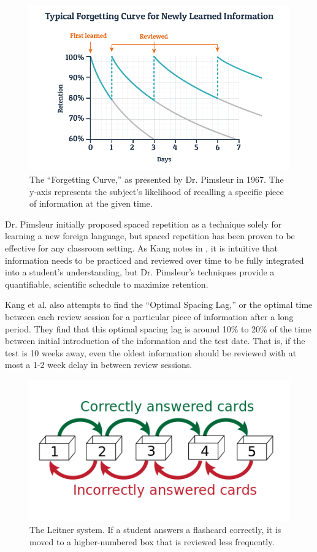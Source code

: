 \begin{figure}[h]
	\includegraphics[width=1.0\linewidth]{figures/forgetting-curve}
	\caption{The ``Forgetting Curve,'' as presented by Dr. Pimsleur in 1967. The y-axis represents the subject's likelihood of recalling a specific piece of information at the given time.}
	\label{fig:forgetting-curve}
\end{figure}

\par Dr. Pimsleur initially proposed spaced repetition as a technique solely for learning a new foreign language, but spaced repetition has been proven to be effective for any classroom setting. As Kang notes in \cite{fiske2016spaced}, it is intuitive that information needs to be practiced and reviewed over time to be fully integrated into a student's understanding, but Dr. Pimsleur's techniques provide a quantifiable, scientific schedule to maximize retention.

\par Kang et al. \cite{fiske2016spaced} also attempts to find the ``Optimal Spacing Lag,'' or the optimal time between each review session for a particular piece of information after a long period. They find that this optimal spacing lag is around 10\% to 20\% of the time between initial introduction of the information and the test date. That is, if the test is 10 weeks away, even the oldest information should be reviewed with at most a 1-2 week delay in between review sessions.

\begin{figure}[h]
	\includegraphics{figures/leitner}
	\caption{The Leitner system. If a student answers a flashcard correctly, it is moved to a higher-numbered box that is reviewed less frequently.}
	\label{fig:leitner}
\end{figure}

